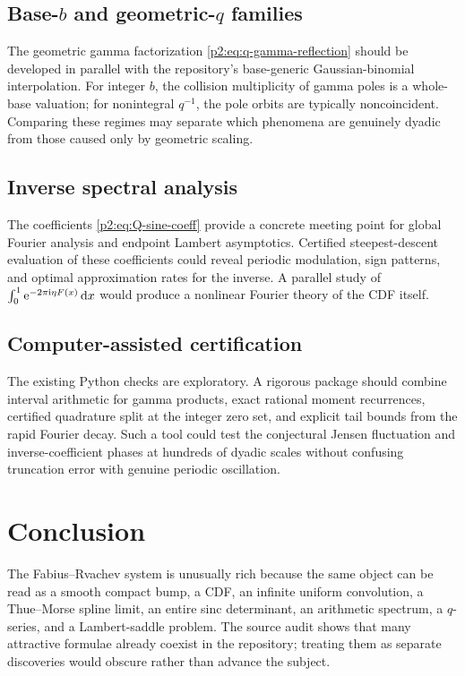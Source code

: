 \documentclass[11pt]{article}
\theoremstyle{definition}
\theoremstyle{remark}
\newcommand{\dd}{\,\mathrm d}
\begin{document}
\subsection{Base-\texorpdfstring{$b$}{b} and geometric-\texorpdfstring{$q$}{q} families}

The geometric gamma factorization \eqref{p2:eq:q-gamma-reflection} should be developed in
parallel with the repository's base-generic Gaussian-binomial interpolation.  For integer
$b$, the collision multiplicity of gamma poles is a whole-base valuation; for nonintegral
$q^{-1}$, the pole orbits are typically noncoincident.  Comparing these regimes may separate
which phenomena are genuinely dyadic from those caused only by geometric scaling.

\subsection{Inverse spectral analysis}

The coefficients \eqref{p2:eq:Q-sine-coeff} provide a concrete meeting point for global Fourier
analysis and endpoint Lambert asymptotics.  Certified steepest-descent evaluation of these
coefficients could reveal periodic modulation, sign patterns, and optimal approximation
rates for the inverse.  A parallel study of
\(
 \int_0^1\e^{-2\pi\ii\eta F(x)}\dd x
\)
would produce a nonlinear Fourier theory of the CDF itself.

\subsection{Computer-assisted certification}

The existing Python checks are exploratory.  A rigorous package should combine interval
arithmetic for gamma products, exact rational moment recurrences, certified quadrature split
at the integer zero set, and explicit tail bounds from the rapid Fourier decay.  Such a tool
could test the conjectural Jensen fluctuation and inverse-coefficient phases at hundreds of
dyadic scales without confusing truncation error with genuine periodic oscillation.

\section{Conclusion}

The Fabius--Rvachev system is unusually rich because the same object can be read as a smooth
compact bump, a CDF, an infinite uniform convolution, a Thue--Morse spline limit, an entire
sinc determinant, an arithmetic spectrum, a $q$-series, and a Lambert-saddle problem.  The
source audit shows that many attractive formulae already coexist in the repository; treating
them as separate discoveries would obscure rather than advance the subject.
\end{document}
